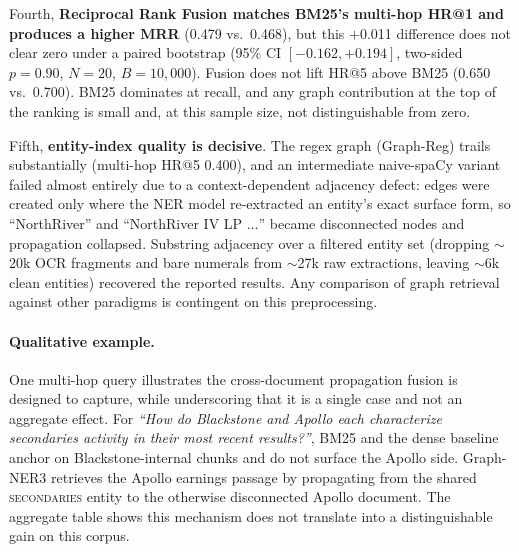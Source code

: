 \documentclass[runningheads]{llncs}
\begin{document}
Fourth, \textbf{Reciprocal Rank Fusion matches BM25's multi-hop HR@1 and produces a higher MRR} (0.479 vs.\ 0.468), but this $+$0.011 difference does not clear zero under a paired bootstrap (95\% CI $[-0.162,+0.194]$, two-sided $p=0.90$, $N{=}20$, $B{=}10{,}000$). Fusion does not lift HR@5 above BM25 (0.650 vs.\ 0.700). BM25 dominates at recall, and any graph contribution at the top of the ranking is small and, at this sample size, not distinguishable from zero.

Fifth, \textbf{entity-index quality is decisive}. The regex graph (Graph-Reg) trails substantially (multi-hop HR@5 0.400), and an intermediate naive-spaCy variant failed almost entirely due to a context-dependent adjacency defect: edges were created only where the NER model re-extracted an entity's exact surface form, so ``NorthRiver'' and ``NorthRiver IV LP $\ldots$'' became disconnected nodes and propagation collapsed. Substring adjacency over a filtered entity set (dropping $\sim$20k OCR fragments and bare numerals from $\sim$27k raw extractions, leaving $\sim$6k clean entities) recovered the reported results. Any comparison of graph retrieval against other paradigms is contingent on this preprocessing.

\paragraph{Qualitative example.} One multi-hop query illustrates the cross-document propagation fusion is designed to capture, while underscoring that it is a single case and not an aggregate effect. For \emph{``How do Blackstone and Apollo each characterize secondaries activity in their most recent results?''}, BM25 and the dense baseline anchor on Blackstone-internal chunks and do not surface the Apollo side. Graph-NER3 retrieves the Apollo earnings passage by propagating from the shared \textsc{secondaries} entity to the otherwise disconnected Apollo document. The aggregate table shows this mechanism does not translate into a distinguishable gain on this corpus.
\end{document}
